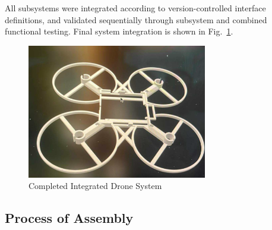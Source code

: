 \noindent All subsystems were integrated according to version-controlled interface definitions, and validated sequentially through subsystem and combined functional testing. Final system integration is shown in Fig.~\ref{fig:complete-drone}.

\begin{figure}[H]
    \centering
    \includegraphics[width=0.7\textwidth]{img/frame-placeholder.png}
    \caption{Completed Integrated Drone System }
    \label{fig:complete-drone}
\end{figure}

\pagebreak


\pagebreak


\pagebreak

\subsection{Process of Assembly}

